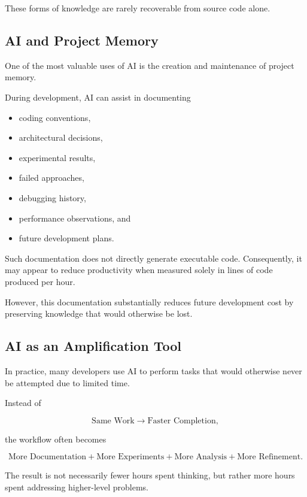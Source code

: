 \documentclass[11pt]{article}
\begin{document}
These forms of knowledge are rarely recoverable from source code alone.

\subsection{AI and Project Memory}

One of the most valuable uses of AI is the creation and maintenance of
project memory.

During development, AI can assist in documenting

\begin{itemize}
\item coding conventions,
\item architectural decisions,
\item experimental results,
\item failed approaches,
\item debugging history,
\item performance observations, and
\item future development plans.
\end{itemize}

Such documentation does not directly generate executable code.
Consequently, it may appear to reduce productivity when measured solely
in lines of code produced per hour.

However, this documentation substantially reduces future development
cost by preserving knowledge that would otherwise be lost.

\subsection{AI as an Amplification Tool}

In practice, many developers use AI to perform tasks that would
otherwise never be attempted due to limited time.

Instead of

\begin{equation}
\text{Same Work} \rightarrow \text{Faster Completion},
\end{equation}

the workflow often becomes

\begin{equation}
\text{More Documentation}
+
\text{More Experiments}
+
\text{More Analysis}
+
\text{More Refinement}.
\end{equation}

The result is not necessarily fewer hours spent thinking, but rather
more hours spent addressing higher-level problems.
\end{document}
